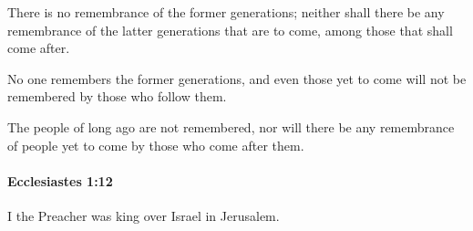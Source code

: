 			\begin{versebox}
					\item[BHS] 
					\item[LXX] 
					\item[ASV] There is no remembrance of the former generations; neither shall there be any remembrance of the latter generations that are to come, among those that shall come after.
					\item[NIV] No one remembers the former generations, and even those yet to come will not be remembered by those who follow them.
					\item[NRSV] The people of long ago are not remembered, nor will there be any remembrance of people yet to come by those who come after them.
			\end{versebox}

		\paragraph{Ecclesiastes 1:12} %
			\label{ECCLESIASTES-1-12}

			I the Preacher was king over Israel in Jerusalem.

